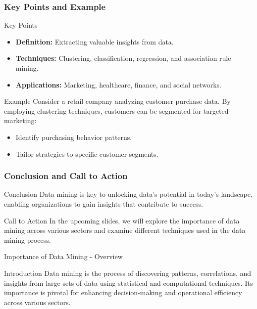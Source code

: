 \documentclass[aspectratio=169]{beamer}
\begin{document}
\begin{frame}[fragile]
    \frametitle{Key Points and Example}
    \begin{block}{Key Points}
        \begin{itemize}
            \item \textbf{Definition:} Extracting valuable insights from data.
            \item \textbf{Techniques:} Clustering, classification, regression, and association rule mining.
            \item \textbf{Applications:} Marketing, healthcare, finance, and social networks.
        \end{itemize}
    \end{block}
    \begin{block}{Example}
        Consider a retail company analyzing customer purchase data. 
        By employing clustering techniques, customers can be segmented for targeted marketing:
        \begin{itemize}
            \item Identify purchasing behavior patterns.
            \item Tailor strategies to specific customer segments.
        \end{itemize}
    \end{block}
\end{frame}

\begin{frame}[fragile]
    \frametitle{Conclusion and Call to Action}
    \begin{block}{Conclusion}
        Data mining is key to unlocking data's potential in today's landscape, enabling organizations to gain insights that contribute to success.
    \end{block}
    \begin{block}{Call to Action}
        In the upcoming slides, we will explore the importance of data mining across various sectors and examine different techniques used in the data mining process.
    \end{block}
\end{frame}

\begin{frame}[fragile]{Importance of Data Mining - Overview}
    \begin{block}{Introduction}
        Data mining is the process of discovering patterns, correlations, and insights from large sets of data using statistical and computational techniques. Its importance is pivotal for enhancing decision-making and operational efficiency across various sectors.
    \end{block}
\end{frame}
\end{document}
